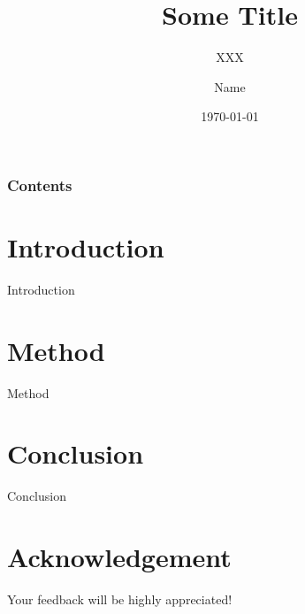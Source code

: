 \documentclass[10pt]{beamer}
\title[City University of Macau]{Some Title
}
\subtitle{XXX}
\author[Name]{Name}
\institute[@city.edu.mo]{ City University of Macau}
\date{\today}
\begin{document}
\frame{\titlepage}
\begin{frame}
\frametitle{Contents}
\tableofcontents
\end{frame}
\section{Introduction}
    \begin{frame}{Introduction}
    \end{frame}

\section{Method}
    \begin{frame}{Method}
    \end{frame}




\section{Conclusion}
    \begin{frame}{Conclusion}
    \end{frame}



\section*{Acknowledgement}  
\begin{frame}
\textcolor{myNewColorA}{\large{\centerline{ Your feedback will be highly appreciated!}}}
\end{frame}
\end{document}
